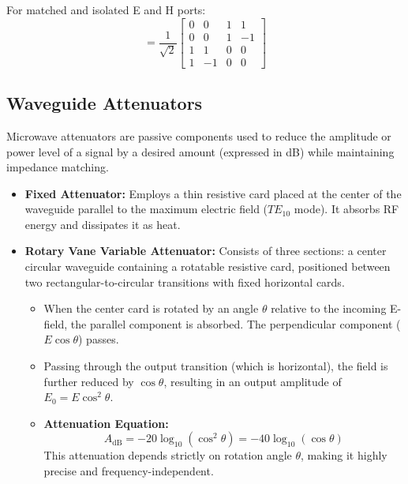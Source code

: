 \documentclass[12pt,a4paper]{article}
\begin{document}
\begin{tcolorbox}[formulabox, title={\textbf{Magic Tee S-Matrix}}]
For matched and isolated E and H ports:
\begin{equation}
  [S] = \frac{1}{\sqrt{2}} \begin{bmatrix} 0 & 0 & 1 & 1 \\ 0 & 0 & 1 & -1 \\ 1 & 1 & 0 & 0 \\ 1 & -1 & 0 & 0 \end{bmatrix}
\end{equation}
\end{tcolorbox}

\subsection{Waveguide Attenuators}
Microwave attenuators are passive components used to reduce the amplitude or power level of a signal by a desired amount (expressed in dB) while maintaining impedance matching.
\begin{itemize}[leftmargin=*, itemsep=3pt]
  \item \textbf{Fixed Attenuator:} Employs a thin resistive card placed at the center of the waveguide parallel to the maximum electric field ($TE_{10}$ mode). It absorbs RF energy and dissipates it as heat.
  \item \textbf{Rotary Vane Variable Attenuator:} Consists of three sections: a center circular waveguide containing a rotatable resistive card, positioned between two rectangular-to-circular transitions with fixed horizontal cards.
  \begin{itemize}[leftmargin=*, itemsep=2.5pt, topsep=0pt]
    \item When the center card is rotated by an angle $\theta$ relative to the incoming E-field, the parallel component is absorbed. The perpendicular component ($E \cos\theta$) passes.
    \item Passing through the output transition (which is horizontal), the field is further reduced by $\cos\theta$, resulting in an output amplitude of $E_0 = E \cos^2\theta$.
    \item \textbf{Attenuation Equation:}
      \begin{equation}
        A_{\text{dB}} = -20 \log_{10}(\cos^2\theta) = -40 \log_{10}(\cos\theta)
      \end{equation}
      This attenuation depends strictly on rotation angle $\theta$, making it highly precise and frequency-independent.
  \end{itemize}
\end{itemize}
\end{document}
